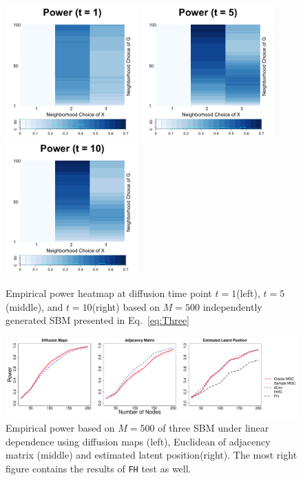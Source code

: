 \documentclass[12pt]{article}
\theoremstyle{definition}
\begin{document}
\begin{figure}[H]
	\centering
	\includegraphics[width=2in]{../Figure/ThreeSBM_power1.png}
	\includegraphics[width=2in]{../Figure/ThreeSBM_power5.png}
	\includegraphics[width=2in]{../Figure/ThreeSBM_power10.png}
	\caption{Empirical power heatmap at diffusion time point $t=1$(left), $t=5$(middle), and $t=10$(right) based on $M = 500$ independently generated SBM presented in Eq.~\ref{eq:Three}}
	\label{fig:ThreeSBM_power}
\end{figure}


\begin{figure}[H]
	\centering
	\includegraphics[width=7in]{../Figure/simplethreeSBM.pdf}
	\caption{Empirical power based on $M = 500$ of three SBM under linear dependence using diffusion maps (left), Euclidean of adjacency matrix (middle) and estimated latent position(right). The most right figure contains the results of \texttt{FH} test as well.}
	\label{fig:threeSBM}
\end{figure}
\end{document}
